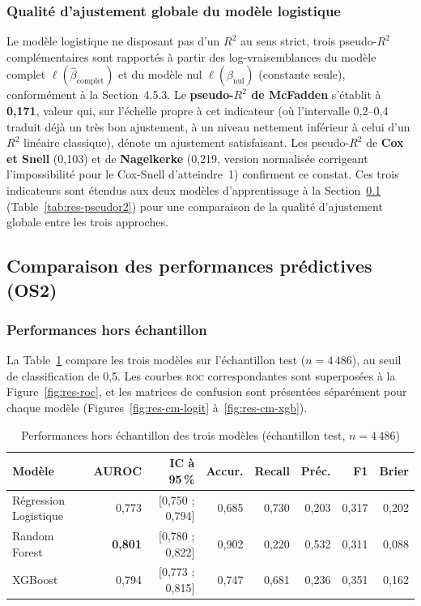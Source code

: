 \subsubsection{Qualité d'ajustement globale du modèle logistique}
\label{sssec:res-pseudor2}

Le modèle logistique ne disposant pas d'un $R^2$ au sens strict, trois
pseudo-$R^2$ complémentaires sont rapportés à partir des log-vraisemblances du
modèle complet $\ell(\hat\beta_{\text{complet}})$ et du modèle nul
$\ell(\hat\beta_{\text{nul}})$ (constante seule), conformément à la
Section~4.5.3. Le \textbf{pseudo-$R^2$ de McFadden} s'établit à \textbf{0,171},
valeur qui, sur l'échelle propre à cet indicateur (où l'intervalle 0,2--0,4
traduit déjà un très bon ajustement, à un niveau nettement inférieur à celui
d'un $R^2$ linéaire classique), dénote un ajustement satisfaisant. Les
pseudo-$R^2$ de \textbf{Cox et Snell} (0,103) et de \textbf{Nagelkerke} (0,219,
version normalisée corrigeant l'impossibilité pour le Cox-Snell d'atteindre~1)
confirment ce constat. Ces trois indicateurs sont étendus aux deux modèles
d'apprentissage à la Section~\ref{ssec:res-os2}
(Table~\ref{tab:res-pseudor2}) pour une comparaison de la qualité d'ajustement
globale entre les trois approches.

\subsection{Comparaison des performances prédictives (OS2)}
\label{ssec:res-os2}

\subsubsection{Performances hors échantillon}

La Table~\ref{tab:res-perf} compare les trois modèles sur l'échantillon test
($n = 4\,486$), au seuil de classification de 0,5. Les courbes \textsc{roc}
correspondantes sont superposées à la Figure~\ref{fig:res-roc}, et les matrices
de confusion sont présentées séparément pour chaque modèle
(Figures~\ref{fig:res-cm-logit} à~\ref{fig:res-cm-xgb}).

\begin{table}[H]
\centering
\caption{Performances hors échantillon des trois modèles (échantillon test, $n = 4\,486$)}
\label{tab:res-perf}
\small\setlength{\tabcolsep}{4pt}
\begin{tabular}{lrrrrrrr}
\toprule
\textbf{Modèle} & \textbf{AUROC} & \textbf{IC à 95\,\%} & \textbf{Accur.} & \textbf{Recall} & \textbf{Préc.} & \textbf{F1} & \textbf{Brier} \\
\midrule
Régression Logistique & 0,773 & [0,750 ; 0,794] & 0,685 & 0,730 & 0,203 & 0,317 & 0,202 \\
Random Forest         & \textbf{0,801} & [0,780 ; 0,822] & 0,902 & 0,220 & 0,532 & 0,311 & 0,088 \\
XGBoost               & 0,794 & [0,773 ; 0,815] & 0,747 & 0,681 & 0,236 & 0,351 & 0,162 \\
\bottomrule
\end{tabular}
\end{table}

